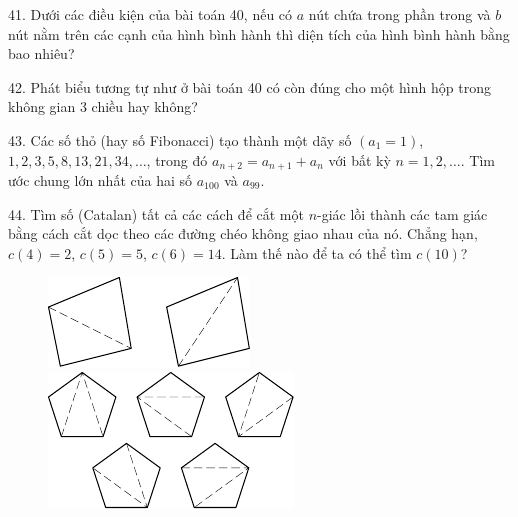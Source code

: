\begin{problem}{41.}
	Dưới các điều kiện của bài toán 40, nếu có $a$ nút chứa trong phần trong và $b$ nút nằm trên các cạnh của hình bình hành thì diện tích của hình bình hành bằng bao nhiêu?
\end{problem}

\begin{problem}{42.}
	Phát biểu tương tự như ở bài toán 40 có còn đúng cho một hình hộp trong không gian 3 chiều hay không?
\end{problem}


\begin{problem}{43.}
	Các số thỏ (hay số Fibonacci) tạo thành một dãy số $(a_1=1)$, $1,2,3,5,8,13,21,34,\dotsc$, trong đó $a_{n+2}=a_{n+1}+a_n$ với bất kỳ $n=1,2,\dotsc$. Tìm ước chung lớn nhất của hai số $a_{100}$ và $a_{99}$.
\end{problem}

\begin{problem}{44.}
	Tìm số (Catalan) tất cả các cách để cắt một $n$-giác lồi thành các tam giác bằng cách cắt dọc theo các đường chéo không giao nhau của nó. Chẳng hạn, $c(4)=2$, $c(5)=5$, $c(6)=14$. Làm thế nào để ta có thể tìm $c(10)$?
	\begin{figure}
		\includegraphics{taskbook-281}
		\qquad
		\includegraphics{taskbook-282}
	\end{figure}
\end{problem}

